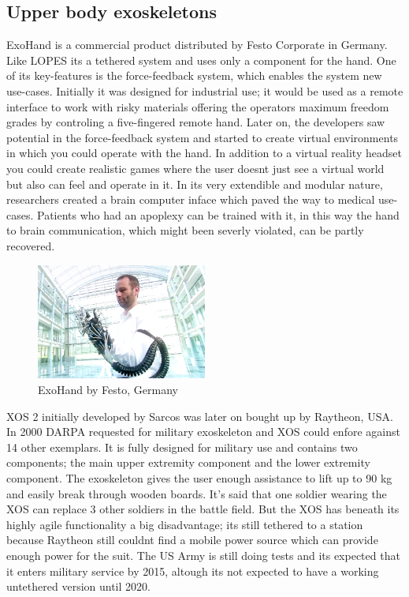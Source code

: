 \documentclass[letterpaper, 10 pt, conference]{ieeeconf}  %
\begin{document}
\subsection{Upper body exoskeletons}

ExoHand is a commercial product distributed by Festo Corporate in Germany. Like LOPES its a tethered system and uses only a component for the hand. One of its key-features is the force-feedback system, which enables the system new use-cases. Initially it was designed for industrial use; it would be used as a remote interface to work with risky materials offering the operators maximum freedom grades by controling a five-fingered remote hand. Later on, the developers saw potential in the force-feedback system and started to create virtual environments in which you could operate with the hand. In addition to a virtual reality headset you could create realistic games where the user doesnt just see a virtual world but also can feel and operate in it. In its very extendible and modular nature, researchers created a brain computer inface which paved the way to medical use-cases. Patients who had an apoplexy can be trained with it, in this way the hand to brain communication, which might been severly violated, can be partly recovered.


\begin{figure}[H]
  \centering
    \includegraphics[width=0.5\textwidth]{img/exohand}
  \caption{ExoHand by Festo, Germany}
\end{figure}


XOS 2 initially developed by Sarcos was later on bought up by Raytheon, USA. In 2000 DARPA requested for military exoskeleton and XOS could enfore against 14 other exemplars. It is fully designed for military use and contains two components; the main upper extremity component and the lower extremity component. The exoskeleton gives the user enough assistance to lift up to 90 kg and easily break through wooden boards. It's said that one soldier wearing the XOS can replace 3 other soldiers in the battle field. But the XOS has beneath its highly agile functionality a big disadvantage; its still tethered to a station because Raytheon still couldnt find a mobile power source which can provide enough power for the suit. The US Army is still doing tests and its expected that it enters military service by 2015, altough its not expected to have a working untethered version until 2020.
\end{document}

